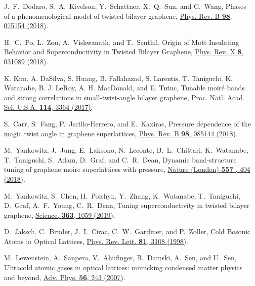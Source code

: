 \documentclass[twocolumn,english,prl,floatfix,citeautoscript,nofootinbib]{revtex4}
\begin{document}
\begin{thebibliography}{999}
 J.~F.~Dodaro, S.~A.~Kivelson, Y.~Schattner,
X.~Q.~Sun, and C.~Wang, Phases of a phenomenological model of twisted
bilayer graphene, \href{https://doi.org/10.1103/PhysRevB.98.075154}{Phys.
Rev. B \textbf{98}, 075154 (2018)}.

 H.~C.~Po, L.~Zou, A.~Vishwanath, and T.~Senthil,
Origin of Mott Insulating Behavior and Superconductivity in Twisted Bilayer
Graphene, \href{https://doi.org/10.1103/PhysRevX.8.031089}{Phys. Rev. X
\textbf{8}, 031089 (2018)}.



 K. Kim, A. DaSilva, S. Huang, B. Fallahazad, S.
Larentis, T. Taniguchi, K. Watanabe, B. J. LeRoy, A. H. MacDonald, and E.
Tutuc, Tunable moir\'e bands and strong correlations in small-twist-angle
bilayer graphene, \href{https://doi.org/10.1073/pnas.1620140114}{Proc. Natl.
Acad. Sci. U.S.A. \textbf{114}, 3364 (2017)}.

 S.~Carr, S.~Fang, P.~Jarillo-Herrero, and
E.~Kaxiras, Pressure dependence of the magic twist angle in graphene
superlattices, \href{https://doi.org/10.1103/PhysRevB.98.085144}{Phys. Rev.
B \textbf{98}, 085144 (2018)}.

 M.~Yankowitz, J.~Jung, E.~Laksono, N.~Leconte,
B.~L.~Chittari, K.~Watanabe, T.~Taniguchi, S.~Adam, D.~Graf, and C.~R.~Dean,
Dynamic band-structure tuning of graphene moire superlattices with pressure,
\href{https://doi.org/10.1038/s41586-018-0107-1}{Nature (London) \textbf{557}%
, 404 (2018)}.

 M.~Yankowitz, S.~Chen, H.~Polshyn, Y.~Zhang,
K.~Watanabe, T.~Taniguchi, D.~Graf, A.~F.~Young, C.~R.~Dean, Tuning
superconductivity in twisted bilayer graphene, \href{https://doi.org/10.1126/science.aav1910}%
{Science, \textbf{363}, 1059 (2019)}.




 D.~Jaksch, C.~Bruder, J.~I.~Cirac,
C.~W.~Gardiner, and P.~Zoller, Cold Bosonic Atoms in Optical Lattices, \href{https://doi.org/10.1103/PhysRevLett.81.3108}%
{Phys. Rev. Lett. \textbf{81}, 3108 (1998)}.

 M.~Lewenstein, A.~Sanpera, V.~Ahufinger,
B.~Damski, A.~Sen, and U.~Sen, Ultracold atomic gases in optical lattices:
mimicking condensed matter physics and beyond, \href{https://doi.org/10.1080/00018730701223200}%
{Adv. Phys. \textbf{56}, 243 (2007)}.


\end{thebibliography}
\end{document}
